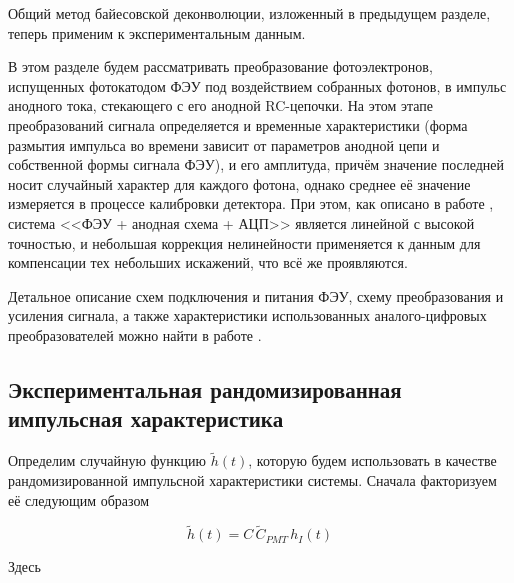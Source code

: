 Общий метод байесовской деконволюции, изложенный в предыдущем разделе, теперь применим к экспериментальным данным.

В этом разделе будем рассматривать преобразование фотоэлектронов, испущенных фотокатодом ФЭУ под воздействием собранных фотонов, в импульс анодного тока, стекающего с его анодной RC-цепочки. На этом этапе преобразований сигнала определяется и временные характеристики (форма размытия импульса во времени зависит от параметров анодной цепи и собственной формы сигнала ФЭУ), и его амплитуда, причём значение последней носит случайный характер для каждого фотона, однако среднее её значение измеряется в процессе калибровки детектора. При этом, как описано в работе \cite{Sphere2015}, система <<ФЭУ + анодная схема + АЦП>> является линейной с высокой точностью, и небольшая коррекция нелинейности применяется к данным для компенсации тех небольших искажений, что всё же проявляются.

Детальное описание схем подключения и питания ФЭУ, схему преобразования и усиления сигнала, а также характеристики использованных аналого-цифровых преобразователей можно найти в работе \cite{SphereDetector2020}.

\subsection{Экспериментальная рандомизированная импульсная характеристика}

\label{sec:experimental-rir}

Определим случайную функцию $\tilde{h}(t)$, которую будем использовать в качестве рандомизированной импульсной характеристики системы. Сначала факторизуем её следующим образом

\begin{equation}
	\label{eq:experimental-rir}
	\tilde{h}(t) = C \, \tilde{C}_{PMT} \, h_I(t)
\end{equation}

Здесь


